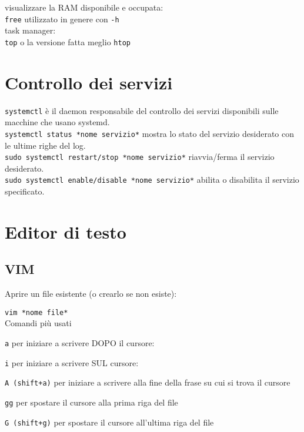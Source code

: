 \documentclass[]{report}
\begin{document}
\noindent visualizzare la RAM disponibile e occupata:\\
\verb|free| utilizzato in genere con \verb|-h|\\

\noindent task manager:\\
\noindent \verb|top| o la versione fatta meglio \verb|htop|

\noindent 



\section{Controllo dei servizi}
\verb|systemctl| è il daemon responsabile del controllo dei servizi disponibili sulle macchine che usano systemd.\\

\noindent \verb|systemctl status *nome servizio*| mostra lo stato del servizio desiderato con le ultime righe del log.\\

\noindent \verb|sudo systemctl restart/stop *nome servizio*| riavvia/ferma il servizio desiderato.\\

\noindent \verb|sudo systemctl enable/disable *nome servizio*| abilita o disabilita il servizio specificato.



\newpage
\section{Editor di testo}
\subsection{VIM}
Aprire un file esistente (o crearlo se non esiste):

\verb|vim *nome file*|\\

\noindent Comandi più usati

\verb|a| per iniziare a scrivere DOPO il cursore:

\verb|i| per iniziare a scrivere SUL cursore:

\verb|A (shift+a)| per iniziare a scrivere alla fine della frase su cui si trova il cursore

\verb|gg| per spostare il cursore alla prima riga del file

\verb|G (shift+g)| per spostare il cursore all'ultima riga del file
\end{document}
